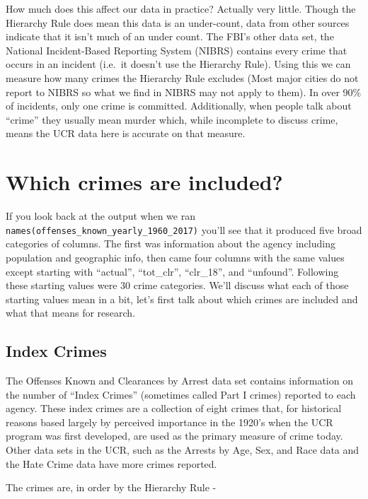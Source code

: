 \documentclass[
  12pt,
]{book}
\begin{document}
How much does this affect our data in practice? Actually very little. Though the Hierarchy Rule does mean this data is an under-count, data from other sources indicate that it isn't much of an under count. The FBI's other data set, the National Incident-Based Reporting System (NIBRS) contains every crime that occurs in an incident (i.e.~it doesn't use the Hierarchy Rule). Using this we can measure how many crimes the Hierarchy Rule excludes (Most major cities do not report to NIBRS so what we find in NIBRS may not apply to them). In over 90\% of incidents, only one crime is committed. Additionally, when people talk about ``crime'' they usually mean murder which, while incomplete to discuss crime, means the UCR data here is accurate on that measure.

\hypertarget{which-crimes-are-included}{%
\section{Which crimes are included?}\label{which-crimes-are-included}}

If you look back at the output when we ran \texttt{names(offenses\_known\_yearly\_1960\_2017)} you'll see that it produced five broad categories of columns. The first was information about the agency including population and geographic info, then came four columns with the same values except starting with ``actual'', ``tot\_clr'', ``clr\_18'', and ``unfound''. Following these starting values were 30 crime categories. We'll discuss what each of those starting values mean in a bit, let's first talk about which crimes are included and what that means for research.

\hypertarget{index-crimes}{%
\subsection{Index Crimes}\label{index-crimes}}

The Offenses Known and Clearances by Arrest data set contains information on the number of ``Index Crimes'' (sometimes called Part I crimes) reported to each agency. These index crimes are a collection of eight crimes that, for historical reasons based largely by perceived importance in the 1920's when the UCR program was first developed, are used as the primary measure of crime today. Other data sets in the UCR, such as the Arrests by Age, Sex, and Race data and the Hate Crime data have more crimes reported.

The crimes are, in order by the Hierarchy Rule -
\end{document}
